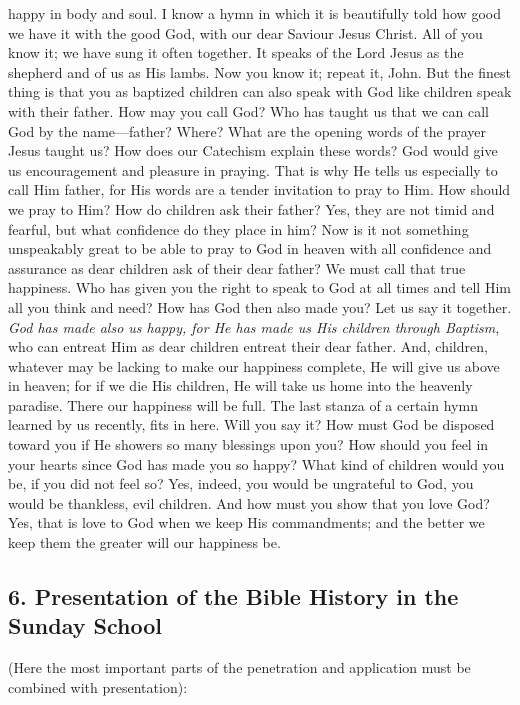 happy in body and soul. I know a hymn in which it is beautifully told how good we have it with the good God, with our dear Saviour Jesus Christ. All of you know it; we have sung it often together. It speaks of the Lord Jesus as the shepherd and of us as His lambs. Now you know it; repeat it, John. But the finest thing is that you as baptized children can also speak with God like children speak with their father. How may you call God? Who has taught us that we can call God by the name—father? Where? What are the opening words of the prayer Jesus taught us? How does our Catechism explain these words? God would give us encouragement and pleasure in praying. That is why He tells us especially to call Him father, for His words are a tender invitation to pray to Him. How should we pray to Him? How do children ask their father? Yes, they are not timid and fearful, but what confidence do they place in him? Now is it not something unspeakably great to be able to pray to God in heaven with all confidence and assurance as dear children ask of their dear father? We must call that true happiness. Who has given you the right to speak to God at all times and tell Him all you think and need? How has God then also made you? Let us say it together. \emph{God has made also us happy, for He has made us His children through Baptism}, who can entreat Him as dear children entreat their dear father. And, children, whatever may be lacking to make our happiness complete, He will give us above in heaven; for if we die His children, He will take us home into the heavenly paradise. There our happiness will be full. The last stanza of a certain hymn learned by us recently, fits in here. Will you say it? How must God be disposed toward you if He showers so many blessings upon you? How should you feel in your hearts since God has made you so happy? What kind of children would you be, if you did not feel so? Yes, indeed, you would be ungrateful to God, you would be thankless, evil children. And how must you show that you love God? Yes, that is love to God when we keep His commandments; and the better we keep them the greater will our happiness be.

\subsection[6. Presentation of the Bible History]{6. Presentation of the Bible History in the Sunday School}

(Here the most important parts of the penetration and application must be combined with presentation):

